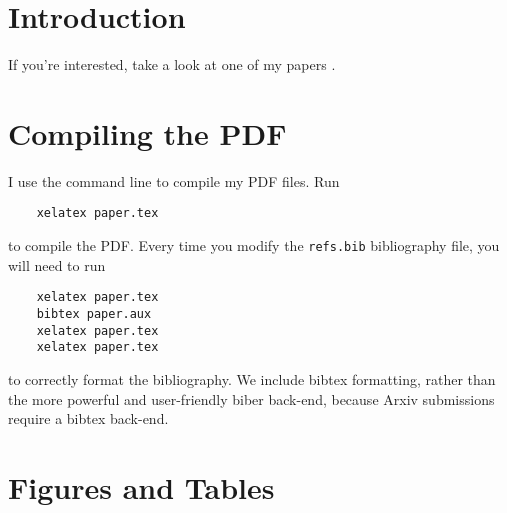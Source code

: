 


%
%

\section{Introduction} \label{sec_intro}

If you're interested, take a look at one of my papers \cite{sahu-mandadapu-pre-2020}.
\lipsum[2]



%
%

\section{Compiling the PDF} \label{sec_compiling}

I use the command line to compile my PDF files.
Run
\begin{verbatim}
	xelatex paper.tex
\end{verbatim}
to compile the PDF.
Every time you modify the \verb+refs.bib+ bibliography file, you will need to run
\begin{verbatim}
	xelatex paper.tex
	bibtex paper.aux
	xelatex paper.tex
	xelatex paper.tex
\end{verbatim}
to correctly format the bibliography.
We include bibtex formatting, rather than the more powerful and user-friendly biber back-end, because Arxiv submissions require a bibtex back-end.



%
%

\section{Figures and Tables} \label{sec_figures_tables}

